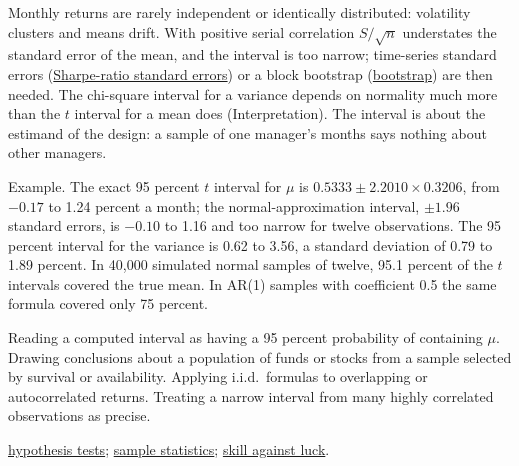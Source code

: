 \begin{qfmethod}
 Monthly returns are rarely independent or identically distributed: volatility clusters and means drift. With positive serial correlation $S/\sqrt n$ understates the standard error of the mean, and the interval is too narrow; time-series standard errors (\hyperref[meth:sharpe-ratio-standard-error]{Sharpe-ratio standard errors}) or a block bootstrap (\hyperref[meth:bootstrap-resampling]{bootstrap}) are then needed. The chi-square interval for a variance depends on normality much more than the $t$ interval for a mean does (Interpretation). The interval is about the estimand of the design: a sample of one manager's months says nothing about other managers.

 Example. The exact 95 percent $t$ interval for $\mu$ is $0.5333\pm2.2010\times0.3206$, from $-0.17$ to 1.24 percent a month; the normal-approximation interval, $\pm1.96$ standard errors, is $-0.10$ to 1.16 and too narrow for twelve observations. The 95 percent interval for the variance is 0.62 to 3.56, a standard deviation of 0.79 to 1.89 percent. In 40{,}000 simulated normal samples of twelve, 95.1 percent of the $t$ intervals covered the true mean. In AR(1) samples with coefficient 0.5 the same formula covered only 75 percent.

 Reading a computed interval as having a 95 percent probability of containing $\mu$. Drawing conclusions about a population of funds or stocks from a sample selected by survival or availability. Applying i.i.d.\ formulas to overlapping or autocorrelated returns. Treating a narrow interval from many highly correlated observations as precise.

 \hyperref[meth:hypothesis-testing]{hypothesis tests}; \hyperref[def:return-sample-statistics]{sample statistics}; \hyperref[meth:skill-luck-significance-tests]{skill against luck}.

\end{qfmethod}

